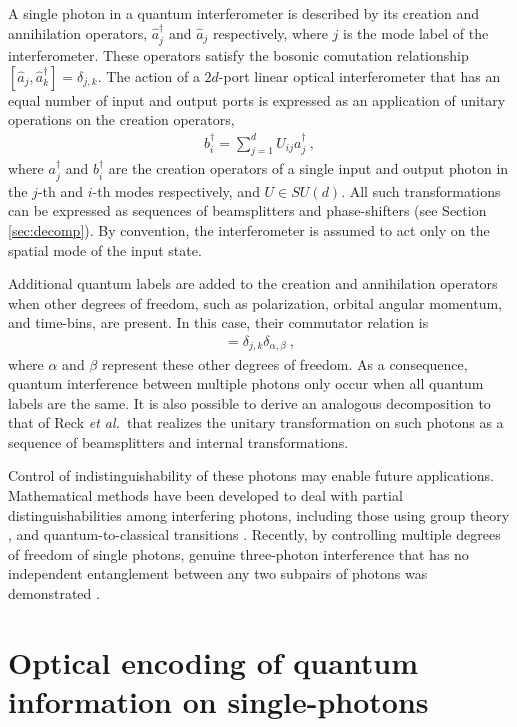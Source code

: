 \documentclass[times,final]{elsarticle}
\newcommand{\ah}{\hat{a}}
\newcommand{\adagh}{\hat{a}^\dag}
\begin{document}
A single photon in a quantum interferometer is described by its creation and annihilation operators, $\adagh_{j}$ and $\hat{a}_j$ respectively, where $j$ is the mode label of the interferometer. These operators satisfy the bosonic comutation relationship $[\ah_{j},\adagh_{k}]=\delta_{j,k}$. The action of a $2d$-port linear optical interferometer that has an equal number of input and output ports is expressed as an application of unitary operations on the creation operators,
\begin{align}
b_i^{\dag}=\sum_{j=1}^d U_{ij}a_j^\dag \ ,
\end{align}
where $a_j^\dag$ and $b_i^\dag$ are the creation operators of a single input and output photon in the $j$-th and $i$-th modes respectively, and $U\in SU(d)$. All such transformations can be expressed as sequences of beamsplitters and phase-shifters \cite{bib:Reck1994} (see Section \ref{sec:decomp}). By convention, the interferometer is assumed to act only on the spatial mode of the input state.

Additional quantum labels are added to the creation and annihilation operators when other degrees of freedom, such as polarization, orbital angular momentum, and time-bins, are present. In this case, their commutator relation is
\begin{align}
[\ah_{j,\alpha},\adagh_{k,\beta}]=\delta_{j,k}\delta_{\alpha,\beta}\ ,
\end{align}
where $\alpha$ and $\beta$ represent these other degrees of freedom. As a consequence, quantum interference between multiple photons only occur when all quantum labels are the same. It is also possible to derive an analogous decomposition to that of Reck {\it et al.~}that realizes the unitary transformation on such photons as a sequence of beamsplitters and internal transformations.

Control of indistinguishability of these photons may enable future applications. Mathematical methods have been developed to deal with partial distinguishabilities among interfering photons, including those using group theory \cite{bib:Tan2013,bib:deGuise2014,bib:deGuise2015}, and quantum-to-classical transitions \cite{bib:Ra2013}. Recently, by controlling multiple degrees of freedom of single photons, genuine three-photon interference that has no independent entanglement between any two subpairs of photons was demonstrated  \cite{bib:Agne17,bib:Menssen17}.

\section{Optical encoding of quantum information on single-photons}\label{sec:encoding}
\end{document}
